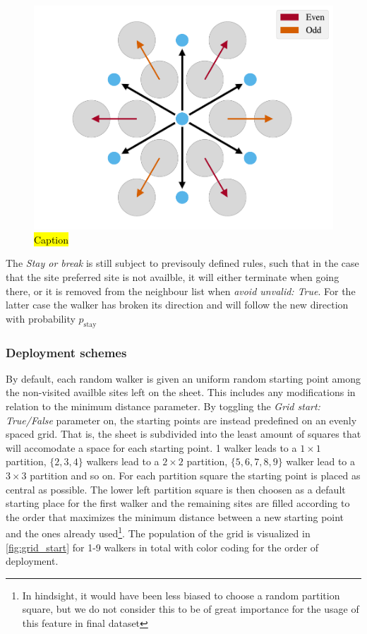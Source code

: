 \begin{figure}[H]
  \centering
  \includegraphics[width=0.5\linewidth]{figures/system/stay_or_break.pdf}
  \caption{\hl{Caption}}
  \label{fig:stay_or_break}
\end{figure}

The \textit{Stay or break} is still subject to previsouly defined rules, such that in the case that the site preferred site is not availble, it will either terminate when going there, or it is removed from the neighbour list when \textit{avoid unvalid: True}. For the latter case the walker has broken its direction and will follow the new direction with probability $p_{\text{stay}}$


\subsubsection{Deployment schemes} %
By default, each random walker is given an uniform random starting point among
the non-visited availble sites left on the sheet. This includes any modifications in relation to the minimum distance parameter. By toggling the \textit{Grid start:
True/False} parameter on, the starting points are instead predefined on an evenly
spaced grid. That is, the sheet is subdivided into the least amount of squares
that will accomodate a space for each starting point. 1 walker leads to a
$1\times 1$ partition, $\{2,3,4\}$ walkers lead to a $2\times 2$ partition,
$\{5,6,7,8,9\}$ walker lead to a $3\times 3$ partition and so on. For each partition square the starting point is placed as central as possible. The lower left partition square is then choosen as a default starting place for the first
walker and the remaining sites are filled according to the order that
maximizes the minimum distance between a new starting point and the ones already
used\footnote{In hindsight, it would have been less biased to choose a random partition square, but we do not consider this to be of great
importance for the usage of this feature in final dataset }. The population of the grid is visualized in \cref{fig:grid_start} for 1-9 walkers in total with color coding for the order of deployment. 


